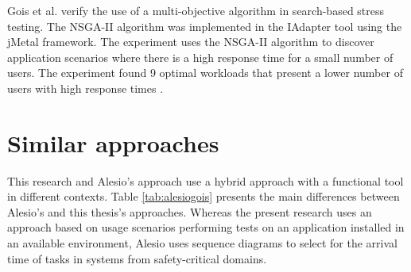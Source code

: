 \documentclass[espaco=umemeio,chapter=TITLE,twoside,openright]{abnt}
\begin{document}
Gois et al. verify the use of a multi-objective algorithm in search-based stress testing. The NSGA-II algorithm was implemented in the IAdapter tool using the jMetal framework. The experiment uses the NSGA-II algorithm to discover application scenarios where there is a high response time for a small number of users.  The experiment found 9 optimal workloads that present a lower number of users with high response times \cite{Gois2017}.

\section{Similar approaches}

This research and Alesio's approach \cite{Alesio2015} use a hybrid approach with a functional tool in different contexts. Table \ref{tab:alesiogois} presents the main differences between Alesio's and this thesis's approaches. Whereas the present research uses an approach based on usage scenarios performing tests on an application installed in an available environment, Alesio uses sequence diagrams  to select for the arrival time of tasks in systems from  safety-critical domains. 
\end{document}
